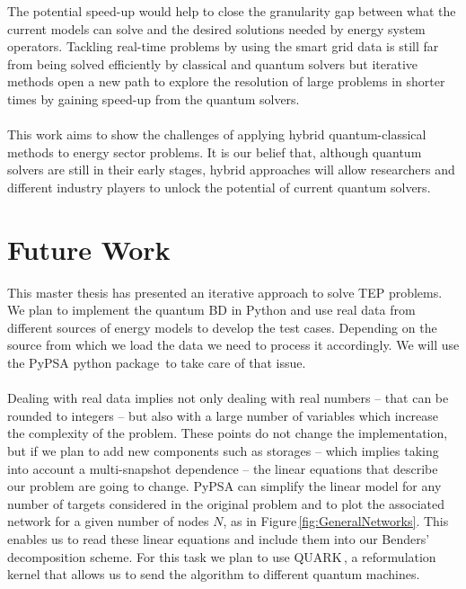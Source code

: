 The potential speed-up would help to close the granularity gap between what the current models can solve and the desired solutions needed by energy system operators. Tackling real-time problems by using the smart grid data is still far from being solved efficiently by classical and quantum solvers but iterative methods open a new path to explore the resolution of large problems in shorter times by gaining speed-up from the quantum solvers.\\\\
This work aims to show the challenges of applying hybrid quantum-classical methods to energy sector problems. It is our belief that, although quantum solvers are still in their early stages, hybrid approaches will allow researchers and different industry players to unlock the potential of current quantum solvers.
\section{Future Work}
This master thesis has presented an iterative approach to solve TEP problems. We plan to implement the quantum BD in Python and use real data from different sources of energy models to develop the test cases. Depending on the source from which we load the data we need to process it accordingly. We will use the PyPSA python package\,\cite{PyPSA-Eur:PyPSA-Eur} to take care of that issue.\\\\
Dealing with real data implies not only dealing with real numbers -- that can be rounded to integers -- but also with a large number of variables which increase the complexity of the problem. These points do not change the implementation, but if we plan to add new components such as storages -- which implies taking into account a multi-snapshot dependence -- the linear equations that describe our problem are going to change. PyPSA can simplify the linear model for any number of targets considered in the original problem and to plot the associated network for a given number of nodes $N$, as in Figure\,\ref{fig:GeneralNetworks}. This enables us to read these linear equations and include them into our Benders' decomposition scheme. For this task we plan to use QUARK\,\cite{dlrsc2023quark}, a reformulation kernel that allows us to send the algorithm to different quantum machines.

